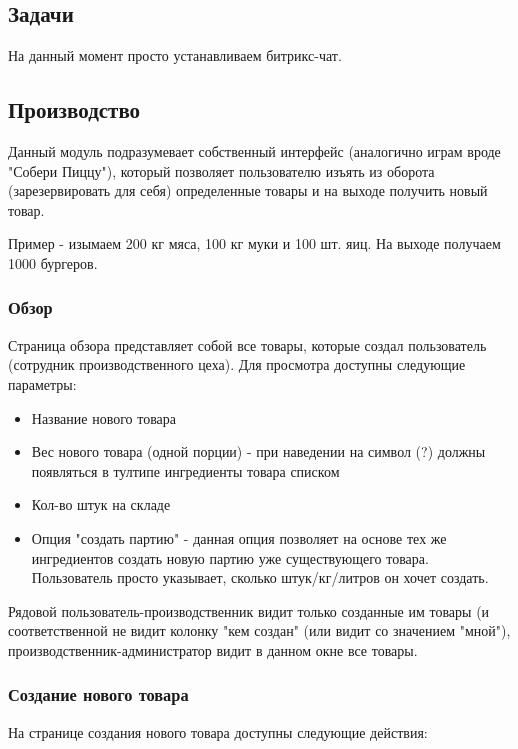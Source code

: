 \documentclass[DIV=calc, paper=a4, fontsize=11pt]{scrartcl} %
\begin{document}
\subsection{Задачи}

На данный момент просто устанавливаем битрикс-чат.

\subsection{Производство}

Данный модуль подразумевает собственный интерфейс (аналогично играм вроде "Собери Пиццу"), который позволяет пользователю изъять из оборота (зарезервировать для себя) определенные товары и на выходе получить новый товар.

Пример - изымаем 200 кг мяса, 100 кг муки и 100 шт. яиц. На выходе получаем 1000 бургеров. 

\subsubsection{Обзор}
Страница обзора представляет собой все товары, которые создал пользователь (сотрудник производственного цеха). Для просмотра доступны следующие параметры:

\begin{itemize}
	\item Название нового товара
	\item Вес нового товара (одной порции) - при наведении на символ (?) должны появляться в тултипе ингредиенты товара списком
	\item Кол-во штук на складе 
	\item Опция "создать партию" - данная опция позволяет на основе тех же ингредиентов создать новую партию уже существующего товара. Пользователь просто указывает, сколько штук/кг/литров он хочет создать.
\end{itemize}

Рядовой пользователь-производственник видит только созданные им товары (и соответственной не видит колонку "кем создан" (или видит со значением "мной"), производственник-администратор видит в данном окне все товары.

\subsubsection{Создание нового товара}

На странице создания нового товара доступны следующие действия:
\end{document}

